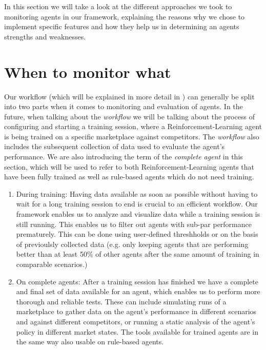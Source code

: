 \label{ch:Approaches}
\begin{jointwork}
	In this section we will take a look at the different approaches we took to monitoring agents in our framework, explaining the reasons why we chose to implement specific features and how they help us in determining an agents strengths and weaknesses.
\end{jointwork}

\section{When to monitor what} \label{sec:WhenToMonitorWhat}

Our workflow (which will be explained in more detail in ) can generally be split into two parts when it comes to monitoring and evaluation of agents. In the future, when talking about the \emph{workflow} we will be talking about the process of configuring and starting a training session, where a Reinforcement-Learning agent is being trained on a specific marketplace against competitors. The \emph{workflow} also includes the subsequent collection of data used to evaluate the agent's performance. We are also introducing the term of the \emph{complete agent} in this section, which will be used to refer to both Reinforcement-Learning agents that have been fully trained as well as rule-based agents which do not need training.

\begin{enumerate}
	\item During training: Having data available as soon as possible without having to wait for a long training session to end is crucial to an efficient workflow. Our framework enables us to analyze and visualize data while a training session is still running. This enables us to filter out agents with sub-par performance prematurely. This can be done using user-defined threshholds or on the basis of previoulsly collected data (e.g. only keeping agents that are performing better than at least 50\% of other agents after the same amount of training in comparable scenarios.) 

	\item On complete agents: After a training session has finished we have a complete and final set of data available for an agent, which enables us to perform more thorough and reliable tests. These can include simulating runs of a marketplace to gather data on the agent's performance in different scenarios and against different competitors, or running a static analysis of the agent's policy in different market states. The tools available for trained agents are in the same way also usable on rule-based agents.
\end{enumerate}

